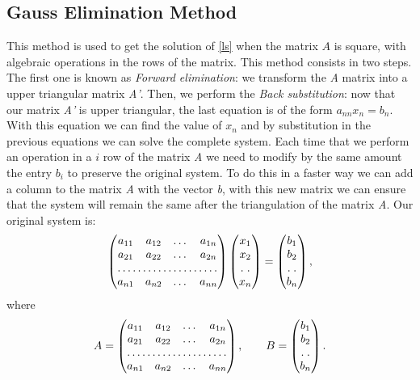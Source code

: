 \documentclass[a4paper,10pt]{report}
\begin{document}
\subsection{Gauss Elimination Method}
This method is used to get the solution of \eqref{ls} when the matrix $A$ is square, with algebraic operations in the rows of the matrix. This method consists in two steps. The first one is known as \emph{Forward elimination}:
we transform the \emph{A} matrix into a upper triangular matrix \emph{A'}. Then, we perform the \emph{Back substitution}: now that our matrix \emph{A'} is upper triangular, the last equation is of the form
$a_{nn}x_n=b_n$. With this equation we can find the value of $x_n$ and by substitution in the previous equations we can solve the complete system.
Each time that we perform an operation in a $i$ row of the matrix \emph{A} we need to modify by the same amount the entry $b_i$ to preserve the original system. To do this in a faster way we can add a
column to the matrix \emph{A} with the vector \emph{b}, with this new matrix we can ensure that the system will remain the same after the triangulation of the matrix \emph{A}.
Our original system is:
\begin{equation*}
\begin{pmatrix}
a_{11} & a_{12} & \dots & a_{1n}\\
a_{21} & a_{22} & \dots & a_{2n}\\
\hdotsfor{4}\\
a_{n1} & a_{n2} & \dots &a_{nn}
\end{pmatrix}
\begin{pmatrix}
x_{1}\\
x_{2}\\
\hdotsfor{1}\\
x_{n}
\end{pmatrix}
=
\begin{pmatrix}
b_{1}\\
b_{2}\\
\hdotsfor{1}\\
b_{n}
\end{pmatrix},
\end{equation*}
where
\begin{equation*}
A=
\begin{pmatrix}
a_{11} & a_{12} & \dots & a_{1n}\\
a_{21} & a_{22} & \dots & a_{2n}\\
\hdotsfor{4}\\
a_{n1} & a_{n2} & \dots &a_{nn}
\end{pmatrix},
\qquad B=
\begin{pmatrix}
b_{1}\\
b_{2}\\
\hdotsfor{1}\\
b_{n}
\end{pmatrix}.
\end{equation*}
\end{document}
